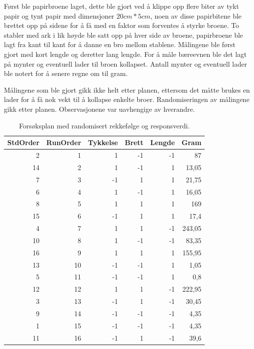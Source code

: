 \documentclass[12pt]{article}
\begin{document}
Først ble papirbroene laget, dette ble gjort ved å klippe opp flere biter av tykt papir og tynt papir med dimensjoner $20 cm * 5 cm$, noen av disse papirbitene ble brettet opp på sidene for å få med en faktor som forventes å styrke broene. To stabler med ark i lik høyde ble satt opp på hver side av broene, papirbroene ble lagt fra kant til kant for å danne en bro mellom stablene. Målingene ble først gjort med kort lengde og deretter lang lengde. For å måle bæreevnen ble det lagt på mynter og eventuell lader til broen kollapset. Antall mynter og eventuell lader ble notert for å senere regne om til gram. 

 Målingene som ble gjort gikk ikke helt etter planen, ettersom det måtte brukes en lader for å få nok vekt til å kollapse enkelte broer. Randomiseringen av målingene gikk etter planen. Observasjonene var uavhengige av hverandre.


\begin{table}[H]
  \centering
  \caption{Forsøksplan med randomisert rekkefølge og responsverdi.}
    \begin{tabular}{rrrrrr}
    \toprule
    \multicolumn{1}{l}{\textbf{StdOrder}} & \multicolumn{1}{l}{\textbf{RunOrder}} & \multicolumn{1}{l}{\textbf{Tykkelse}} & \multicolumn{1}{l}{\textbf{Brett}} & \multicolumn{1}{l}{\textbf{Lengde}} & \multicolumn{1}{l}{\textbf{Gram}} \\
    \midrule
    2     & 1     & 1     & -1    & -1    & 87 \\
    \midrule
    14    & 2     & 1     & -1    & 1     & 13,05 \\
    \midrule
    7     & 3     & -1    & 1     & 1     & 21,75 \\
    \midrule
    6     & 4     & 1     & -1    & 1     & 16,05 \\
    \midrule
    8     & 5     & 1     & 1     & 1     & 169 \\
    \midrule
    15    & 6     & -1    & 1     & 1     & 17,4 \\
    \midrule
    4     & 7     & 1     & 1     & -1    & 243,05 \\
    \midrule
    10    & 8     & 1     & -1    & -1    & 83,35 \\
    \midrule
    16    & 9     & 1     & 1     & 1     & 155,95 \\
    \midrule
    13    & 10    & -1    & -1    & 1     & 1,05 \\
    \midrule
    5     & 11    & -1    & -1    & 1     & 0,8 \\
    \midrule
    12    & 12    & 1     & 1     & -1    & 222,95 \\
    \midrule
    3     & 13    & -1    & 1     & -1    & 30,45 \\
    \midrule
    9     & 14    & -1    & -1    & -1    & 4,35 \\
    \midrule
    1     & 15    & -1    & -1    & -1    & 4,35 \\
    \midrule
    11    & 16    & -1    & 1     & -1    & 39,6 \\
    \bottomrule
    \end{tabular}%
  \label{tab:tab3}%
\end{table}%
\end{document}
